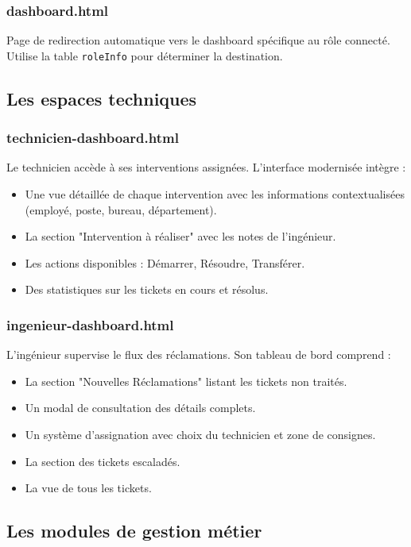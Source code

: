 \documentclass[12pt,a4paper,twoside]{report}
\begin{document}
\subsubsection{dashboard.html}
Page de redirection automatique vers le dashboard spécifique au rôle connecté. Utilise la table \texttt{roleInfo} pour déterminer la destination.

\subsection{Les espaces techniques}

\subsubsection{technicien-dashboard.html}
Le technicien accède à ses interventions assignées. L'interface modernisée intègre :
\begin{itemize}
    \item Une vue détaillée de chaque intervention avec les informations contextualisées (employé, poste, bureau, département).
    \item La section "Intervention à réaliser" avec les notes de l'ingénieur.
    \item Les actions disponibles : Démarrer, Résoudre, Transférer.
    \item Des statistiques sur les tickets en cours et résolus.
\end{itemize}

\subsubsection{ingenieur-dashboard.html}
L'ingénieur supervise le flux des réclamations. Son tableau de bord comprend :
\begin{itemize}
    \item La section "Nouvelles Réclamations" listant les tickets non traités.
    \item Un modal de consultation des détails complets.
    \item Un système d'assignation avec choix du technicien et zone de consignes.
    \item La section des tickets escaladés.
    \item La vue de tous les tickets.
\end{itemize}

\subsection{Les modules de gestion métier}
\end{document}
